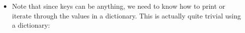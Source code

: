 \documentclass[letterpaper,10pt,english]{sphinxmanual}
\begin{document}
\begin{itemize}
\item {} 
Note that since keys can be anything, we need to know how to print or iterate through the
values in a dictionary. This is actually quite trivial using a dictionary:

\begin{sphinxVerbatim}[commandchars=\\\{\}]
      
     \PYG{p}{[}\PYG{p}{]}
\end{sphinxVerbatim}

\end{itemize}
\end{document}
